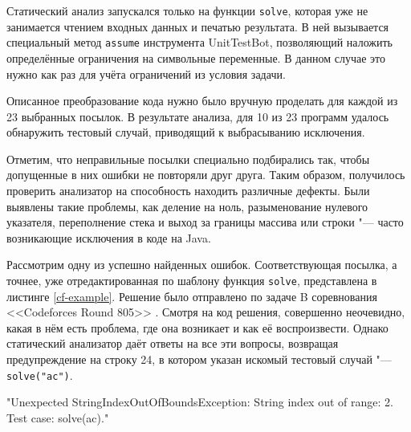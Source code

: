 Статический анализ запускался только на функции \verb|solve|, которая уже не занимается чтением входных данных и печатью результата. В ней вызывается специальный метод \verb|assume| инструмента UnitTestBot, позволяющий наложить определённые ограничения на символьные переменные. В данном случае это нужно как раз для учёта ограничений из условия задачи. 

Описанное преобразование кода нужно было вручную проделать для каждой из 23 выбранных посылок. В результате анализа, для 10 из 23 программ удалось обнаружить тестовый случай, приводящий к выбрасыванию исключения.

Отметим, что неправильные посылки специально подбирались так, чтобы допущенные в них ошибки не повторяли друг друга. Таким образом, получилось проверить анализатор на способность находить различные дефекты. Были выявлены такие проблемы, как деление на ноль, разыменование нулевого указателя, переполнение стека и выход за границы массива или строки "--- часто возникающие исключения в коде на Java.

Рассмотрим одну из успешно найденных ошибок. Соответствующая посылка, а точнее, уже отредактированная по шаблону функция \verb|solve|, представлена в листинге \ref{cf-example}. Решение было отправлено по задаче B соревнования <<Codeforces Round 805>> \cite{cf-805B}. Смотря на код решения, совершенно неочевидно, какая в нём есть проблема, где она возникает и как её воспроизвести. Однако статический анализатор даёт ответы на все эти вопросы, возвращая предупреждение на строку 24, в котором указан искомый тестовый случай "--- \verb|solve("ac")|.

\begin{zerocode}
"Unexpected StringIndexOutOfBoundsException:
     String index out of range: 2.
 Test case: solve(ac)."
\end{zerocode}
